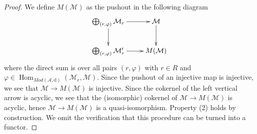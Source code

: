 \documentclass[10pt,a4paper]{amsart}
\theoremstyle{plain}
\theoremstyle{definition}
\theoremstyle{remark}
\numberwithin{equation}{subsection}
\def\Hom{\mathop{\mathrm{Hom}}\nolimits}
\begin{document}
\begin{proof}
We define $M(\mathcal{M})$ as the pushout in the following diagram
$$
\xymatrix{
\bigoplus_{(r, \varphi)} \mathcal{M}_r \ar[r] \ar[d] &
\mathcal{M} \ar[d] \\
\bigoplus_{(r, \varphi)} \mathcal{M}'_r \ar[r] &
M(\mathcal{M})
}
$$
where the direct sum is over all pairs $(r, \varphi)$
with $r \in R$ and $\varphi \in
\Hom_{\textit{Mod}(\mathcal{A}, \text{d})}(\mathcal{M}_r, \mathcal{M})$.
Since the pushout of an injective map is injective, we see that
$\mathcal{M} \to M(\mathcal{M})$ is injective.
Since the cokernel of the left vertical arrow is acyclic,
we see that the (isomorphic) cokernel of $\mathcal{M} \to M(\mathcal{M})$
is acyclic, hence $\mathcal{M} \to M(\mathcal{M})$
is a quasi-isomorphism. Property (2) holds by construction.
We omit the verification that
this procedure can be turned into a functor.
\end{proof}
\end{document}
